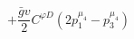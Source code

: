 %
\begin{dmath*}
%
  +  \frac{{\bar g}{} v}{2}C^{ \varphi  D} \left(2 p_1^{\mu_4} - p_3^{\mu_4}\right)
%
\end{dmath*}
%

